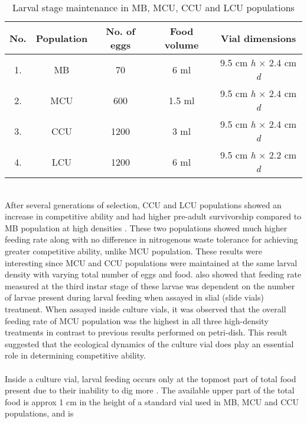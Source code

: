 \begin{table}[h]
  \centering
  \begin{tabular}{|c|c|c|c|c|}
    \hline
    \textbf{No.} & \textbf{Population} & \textbf{No. of eggs} & \textbf{Food volume} & \textbf{Vial dimensions} \\
    \hline
    1. & MB & 70 & 6 ml & 9.5 cm \textit{h} $\times$ 2.4 cm \textit{d} \\
    \hline
    2. & MCU & 600 & 1.5 ml & 9.5 cm \textit{h} $\times$ 2.4 cm \textit{d} \\
    \hline
    3. & CCU & 1200 & 3 ml & 9.5 cm \textit{h} $\times$ 2.4 cm \textit{d} \\
    \hline
    4. & LCU & 1200 & 6 ml & 9.5 cm \textit{h} $\times$ 2.2 cm \textit{d} \\
    \hline
  \end{tabular}
  \caption{Larval stage maintenance in MB, MCU, CCU and LCU populations}
  \label{tab:larval_pop}
\end{table}\\
After several generations of selection, CCU and LCU populations showed an increase in competitive ability and had higher pre-adult survivorship compared to MB population at high densities \citep{sarangiEcologicalDetailsMediate2018}. These two populations showed much higher feeding rate along with no difference in nitrogenous waste tolerance for achieving greater competitive ability, unlike MCU population. These results were interesting since MCU and CCU populations were maintained at the same larval density with varying total number of eggs and food. \citet{sarangiEcologicalDetailsMediate2018} also showed that feeding rate measured at the third instar stage of these larvae was dependent on the number of larvae present during larval feeding when assayed in slial (slide vials) treatment. When assayed inside culture vials, it was observed that the overall feeding rate of MCU population was the highest in all three high-density treatments in contrast to previous results performed on petri-dish. This result suggested that the ecological dynamics of the culture vial does play an essential role in determining competitive ability.\\\\
Inside a culture vial, larval feeding occurs only at the topmost part of total food present due to their inability to dig more \citep{godoy-herreraInterIntrapopulationalVariation1977}. The available upper part of the total food is approx 1 cm in the height of a standard vial used in MB, MCU and CCU populations, and is
